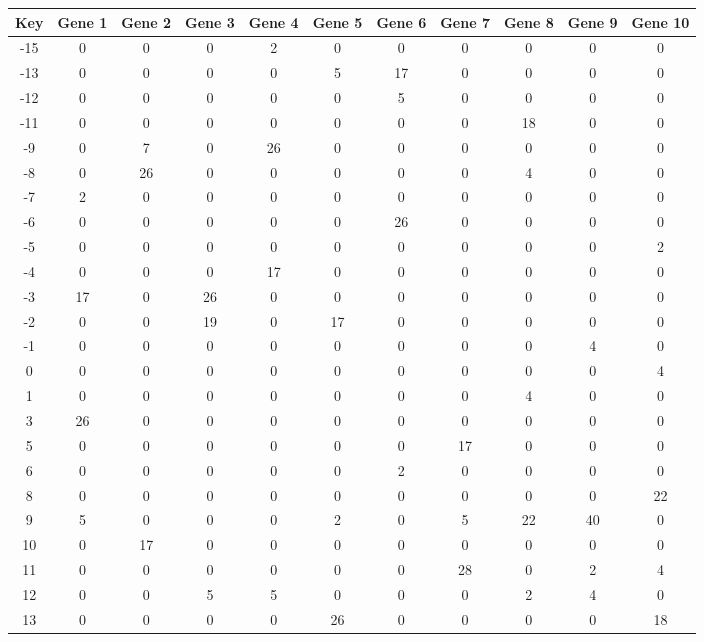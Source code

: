 \begin{tabular}{|c|c|c|c|c|c|c|c|c|c|c|}
\hline
Key & Gene 1 & Gene 2 & Gene 3 & Gene 4 & Gene 5 & Gene 6 & Gene 7 & Gene 8 & Gene 9 & Gene 10 \\
\hline
-15 & 0 & 0 & 0 & 2 & 0 & 0 & 0 & 0 & 0 & 0 \\
-13 & 0 & 0 & 0 & 0 & 5 & 17 & 0 & 0 & 0 & 0 \\
-12 & 0 & 0 & 0 & 0 & 0 & 5 & 0 & 0 & 0 & 0 \\
-11 & 0 & 0 & 0 & 0 & 0 & 0 & 0 & 18 & 0 & 0 \\
-9 & 0 & 7 & 0 & 26 & 0 & 0 & 0 & 0 & 0 & 0 \\
-8 & 0 & 26 & 0 & 0 & 0 & 0 & 0 & 4 & 0 & 0 \\
-7 & 2 & 0 & 0 & 0 & 0 & 0 & 0 & 0 & 0 & 0 \\
-6 & 0 & 0 & 0 & 0 & 0 & 26 & 0 & 0 & 0 & 0 \\
-5 & 0 & 0 & 0 & 0 & 0 & 0 & 0 & 0 & 0 & 2 \\
-4 & 0 & 0 & 0 & 17 & 0 & 0 & 0 & 0 & 0 & 0 \\
-3 & 17 & 0 & 26 & 0 & 0 & 0 & 0 & 0 & 0 & 0 \\
-2 & 0 & 0 & 19 & 0 & 17 & 0 & 0 & 0 & 0 & 0 \\
-1 & 0 & 0 & 0 & 0 & 0 & 0 & 0 & 0 & 4 & 0 \\
0 & 0 & 0 & 0 & 0 & 0 & 0 & 0 & 0 & 0 & 4 \\
1 & 0 & 0 & 0 & 0 & 0 & 0 & 0 & 4 & 0 & 0 \\
3 & 26 & 0 & 0 & 0 & 0 & 0 & 0 & 0 & 0 & 0 \\
5 & 0 & 0 & 0 & 0 & 0 & 0 & 17 & 0 & 0 & 0 \\
6 & 0 & 0 & 0 & 0 & 0 & 2 & 0 & 0 & 0 & 0 \\
8 & 0 & 0 & 0 & 0 & 0 & 0 & 0 & 0 & 0 & 22 \\
9 & 5 & 0 & 0 & 0 & 2 & 0 & 5 & 22 & 40 & 0 \\
10 & 0 & 17 & 0 & 0 & 0 & 0 & 0 & 0 & 0 & 0 \\
11 & 0 & 0 & 0 & 0 & 0 & 0 & 28 & 0 & 2 & 4 \\
12 & 0 & 0 & 5 & 5 & 0 & 0 & 0 & 2 & 4 & 0 \\
13 & 0 & 0 & 0 & 0 & 26 & 0 & 0 & 0 & 0 & 18 \\
\hline
\end{tabular}